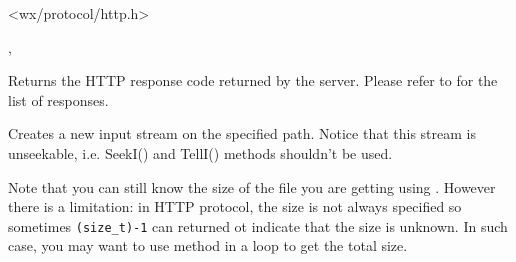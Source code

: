 \section{}\label{wxhttp}


\\
\\
\\


<wx/protocol/http.h>




, 



\label{wxhttpgetresponse}


Returns the HTTP response code returned by the server. Please refer to
 for the list of responses.


\label{wxhttpgetinputstream}


Creates a new input stream on the specified path. Notice that this stream is
unseekable, i.e. SeekI() and TellI() methods shouldn't be used.

Note that you can still know the size of the file you are getting using 
. However there is a
limitation: in HTTP protocol, the size is not always specified so sometimes
\texttt{(size\_t)-1} can returned ot indicate that the size is unknown. In such
case, you may want to use  
method in a loop to get the total size.

